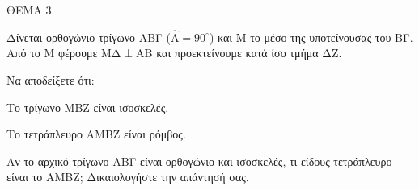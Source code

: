 
ΘΕΜΑ 3

Δίνεται ορθογώνιο τρίγωνο ΑΒΓ ($\widehat{\text{A}} = 90^\circ$) και Μ το μέσο της υποτείνουσας του ΒΓ. Από το Μ φέρουμε ΜΔ$\perp$ΑΒ και προεκτείνουμε κατά ίσο τμήμα ΔΖ.

\begin{alist}
\item Να αποδείξετε ότι:
    \begin{sublist}
      \item Το τρίγωνο ΜΒΖ είναι ισοσκελές. 
      \item Το τετράπλευρο ΑΜΒΖ είναι ρόμβος. 
    \end{sublist}


\item Αν το αρχικό τρίγωνο ΑΒΓ είναι ορθογώνιο και ισοσκελές, τι είδους τετράπλευρο είναι το ΑΜΒΖ; Δικαιολογήστε την απάντησή σας. 
\end{alist}
